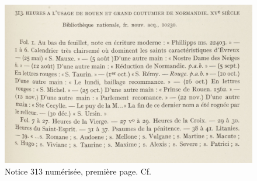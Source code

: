 \documentclass[a4paper,12pt,twoside]{book}
\begin{document}
    
    \begin{figure}[!h]
    \centering
    \includegraphics[width=15cm]{img/Notices_Leroquais/Notice313/Papier/noticepapier_313_1.jpg}
    \caption{Notice 313 numérisée, première page. Cf. \cite[p. 304]{Leroquais_notices}}
    \end{figure}
    \clearpage
    
\end{document}
